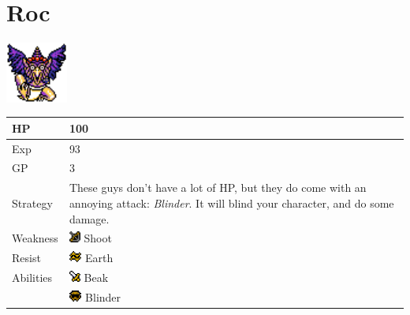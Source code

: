 \section{Roc}
\label{monster:roc}

\includegraphics[height=2cm,keepaspectratio]{./resources/monster/roc}

\begin{longtable}{ l p{9cm} }
	HP
	& 100
\\ \hline
	Exp
	& 93
\\ \hline
	GP
	& 3
\\ \hline
	Strategy
	& These guys don't have a lot of HP, but they do come with an annoying attack: \textit{Blinder}. It will blind your character, and do some damage.
\\ \hline
	Weakness
	& \includegraphics[height=1em,keepaspectratio]{./resources/effects/shoot} Shoot
\\ \hline
	Resist
	& \includegraphics[height=1em,keepaspectratio]{./resources/effects/earth} Earth
\\ \hline
	Abilities
	& \includegraphics[height=1em,keepaspectratio]{./resources/effects/damage} Beak \\
	& \includegraphics[height=1em,keepaspectratio]{./resources/effects/blind} Blinder
\end{longtable}
